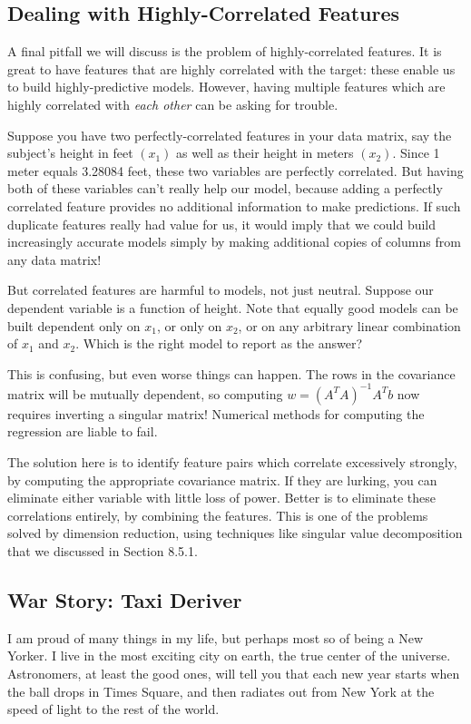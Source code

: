 \documentclass[10pt]{article}
\begin{document}
\subsection{Dealing with Highly-Correlated Features}
A final pitfall we will discuss is the problem of highly-correlated features. It is great to have features that are highly correlated with the target: these enable us to build highly-predictive models. However, having multiple features which are highly correlated with \textit{each other} can be asking for trouble.

Suppose you have two perfectly-correlated features in your data matrix, say the subject's height in feet $\left(x_{1}\right)$ as well as their height in meters $\left(x_{2}\right)$. Since 1 meter equals 3.28084 feet, these two variables are perfectly correlated. But having both of these variables can't really help our model, because adding a perfectly correlated feature provides no additional information to make predictions. If such duplicate features really had value for us, it would imply that we could build increasingly accurate models simply by making additional copies of columns from any data matrix!

But correlated features are harmful to models, not just neutral. Suppose our dependent variable is a function of height. Note that equally good models can be built dependent only on $x_{1}$, or only on $x_{2}$, or on any arbitrary linear combination of $x_{1}$ and $x_{2}$. Which is the right model to report as the answer?

This is confusing, but even worse things can happen. The rows in the covariance matrix will be mutually dependent, so computing $w=(A^{T} A)^{-1} A^{T} b$ now requires inverting a singular matrix! Numerical methods for computing the regression are liable to fail.

The solution here is to identify feature pairs which correlate excessively strongly, by computing the appropriate covariance matrix. If they are lurking, you can eliminate either variable with little loss of power. Better is to eliminate these correlations entirely, by combining the features. This is one of the problems solved by dimension reduction, using techniques like singular value decomposition that we discussed in Section 8.5.1.

\subsection{War Story: Taxi Deriver}
I am proud of many things in my life, but perhaps most so of being a New Yorker. I live in the most exciting city on earth, the true center of the universe. Astronomers, at least the good ones, will tell you that each new year starts when the ball drops in Times Square, and then radiates out from New York at the speed of light to the rest of the world.
\end{document}
